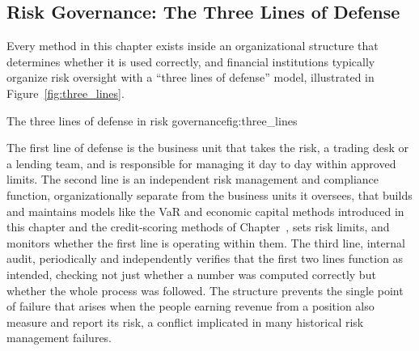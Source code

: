 \documentclass[../ai_in_finance]{subfiles}
\begin{document}
\subsection{Risk Governance: The Three Lines of Defense}

Every method in this chapter exists inside an organizational structure that determines whether it is used correctly, and financial institutions typically organize risk oversight with a ``three lines of defense'' model, illustrated in Figure~\ref{fig:three_lines}.

\begin{bookfigure}[htbp]{The three lines of defense in risk governance}{fig:three_lines}
\end{bookfigure}

The first line of defense is the business unit that takes the risk, a trading desk or a lending team, and is responsible for managing it day to day within approved limits.
The second line is an independent risk management and compliance function, organizationally separate from the business units it oversees, that builds and maintains models like the VaR and economic capital methods introduced in this chapter and the credit-scoring methods of Chapter~, sets risk limits, and monitors whether the first line is operating within them.
The third line, internal audit, periodically and independently verifies that the first two lines function as intended, checking not just whether a number was computed correctly but whether the whole process was followed. The structure prevents the single point of failure that arises when the people earning revenue from a position also measure and report its risk, a conflict implicated in many historical risk management failures.
\end{document}
